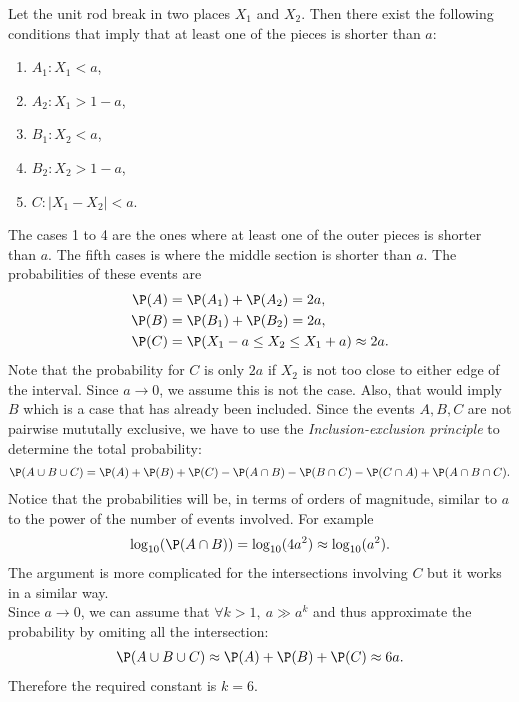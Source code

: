 \documentclass{article}
\begin{document}
Let the unit rod break in two places $X_1$ and $X_2$. Then there
exist the following conditions that imply that at least one of the pieces is shorter
than $a$:
\begin{enumerate}
	\item $A_1:X_1<a$,
	\item $A_2:X_1>1-a$,
	\item $B_1:X_2<a$,
	\item $B_2:X_2>1-a$,
	\item $C:|X_1-X_2|<a$.
\end{enumerate}
The cases 1 to 4 are the ones where at least one of the outer
pieces is shorter than $a$. The fifth cases is where the middle section
is shorter than $a$. The probabilities of these events are
\begin{align*}
	\P(A) & = \P(A_1) + \P(A_2) = 2a,                  \\
	\P(B) & = \P(B_1) + \P(B_2) = 2a,                  \\
	\P(C) & = \P(X_1-a\leq X_2 \leq X_1+a) \approx 2a.
\end{align*}
Note that the probability for $C$ is only $2a$ if $X_2$ is not too close to
either edge of the interval. Since $a\to 0$, we assume this is not the case.
Also, that would imply $B$ which is a case that has already been included.
Since the events $A,B,C$ are not pairwise mututally exclusive,
we have to use the \emph{Inclusion-exclusion principle}
to determine the total probability:
\begin{align*}
	\P(A\cup B\cup C) = \P(A) + \P(B) + \P(C) - \P(A \cap B) - \P(B\cap C) - \P(C\cap A) + \P(A\cap B\cap C).
\end{align*}
Notice that the probabilities will be, in terms of orders of magnitude,
similar to $a$ to the power of the number of events involved. For example
\begin{align*}
	\log_{10}(\P(A\cap B)) = \log_{10}(4a^2) \approx \log_{10}(a^2).
\end{align*}
The argument is more complicated for the intersections involving $C$ but
it works in a similar way.\\
Since $a\to 0$, we can assume that $\forall k>1,\:a\gg a^k$ and thus
approximate the probability by omiting all the intersection:
\begin{align*}
	\P(A\cup B\cup C) \approx \P(A) + \P(B) + \P(C) \approx 6a.
\end{align*}
Therefore the required constant is $k=6$.
\end{document}
